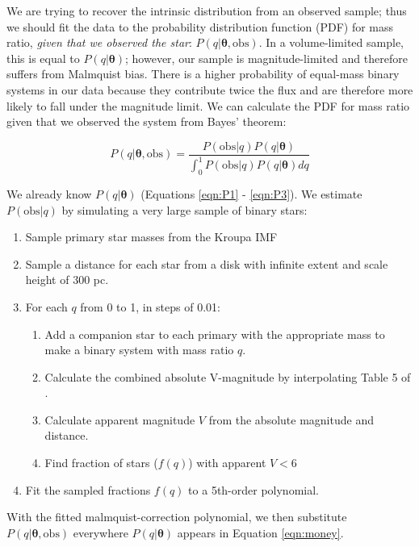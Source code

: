 \documentclass{emulateapj}
\renewcommand{\vec}[1]{\bm{#1}}
\begin{document}
We are trying to recover the intrinsic distribution from an observed sample; thus we should fit the data to the probability distribution function (PDF) for mass ratio, \emph{given that we observed the star}: $P(q|\vec{\theta}, \mathrm{obs})$. In a volume-limited sample, this is equal to $P(q|\vec{\theta})$; however, our sample is magnitude-limited and therefore suffers from Malmquist bias. There is a higher probability of equal-mass binary systems in our data because they contribute twice the flux and are therefore more likely to fall under the magnitude limit. We can calculate the PDF for mass ratio given that we observed the system from Bayes' theorem:

\begin{equation}
P(q|\vec{\theta}, \mathrm{obs}) = \frac{P(\mathrm{obs}|q) P(q|\vec{\theta})}{\int_0^1 P(\mathrm{obs}|q) P(q|\vec{\theta}) dq}
\end{equation}

We already know $P(q|\vec{\theta})$ (Equations \ref{eqn:P1} - \ref{eqn:P3}). We estimate $P(\mathrm{obs}|q)$ by simulating a very large sample of binary stars:

\begin{enumerate}
\item Sample primary star masses from the Kroupa IMF \citep{Kroupa2002}
\item Sample a distance for each star from a disk with infinite extent and scale height of $300$ pc. 
\item For each $q$ from 0 to 1, in steps of 0.01:
\begin{enumerate}
  \item Add a companion star to each primary with the appropriate mass to make a binary system with mass ratio $q$.
  \item Calculate the combined absolute V-magnitude by interpolating Table 5 of \citet{Pecaut2013}.
  \item Calculate apparent magnitude $V$ from the absolute magnitude and distance.
  \item Find fraction of stars ($f(q)$) with apparent $V < 6$
\end{enumerate}
\item Fit the sampled fractions $f(q)$ to a 5th-order polynomial.
\end{enumerate}

With the fitted malmquist-correction polynomial, we then substitute $P(q|\vec{\theta}, \mathrm{obs})$ everywhere $P(q|\vec{\theta})$ appears in Equation \ref{eqn:money}.
\end{document}
